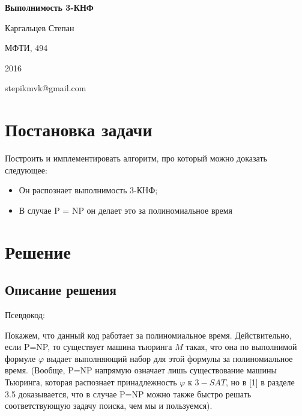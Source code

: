 \documentclass[paper=a4, fontsize=11pt]{scrartcl}
\begin{document}
\begin{center}
\textbf{Выполнимость 3-КНФ}
\end{center}

\begin{flushright}
Каргальцев Степан

МФТИ, 494

2016

stepikmvk@gmail.com
\end{flushright}

\tableofcontents

\newpage

\section{Постановка задачи}
Построить и имплементировать алгоритм, про который можно доказать следующее:
\begin{itemize}
\item Он распознает выполнимость 3-КНФ;
\item В случае P = NP он делает это за полиномиальное время
\end{itemize}

\section{Решение}


\subsection{Описание решения}
\bigskip

Псевдокод:\\


\begin{algorithm}[H]
		\SetAlgoLined
\end{algorithm}


Покажем, что данный код работает за полиномиальное время. Действительно,
если P=NP, то существует машина тьюринга $M$ такая, что она по выполнимой
формуле $\varphi$ выдает выполняющий набор для этой формулы за полиномиальное
время. (Вообще, P=NP напрямую означает лишь существование машины Тьюринга,
которая распознает принадлежность $\varphi$ к $3-SAT$, но в [1] в разделе 3.5
доказывается, что
в случае P=NP можно также быстро решать соответствующую задачу поиска, чем мы и
пользуемся).\\
\end{document}
